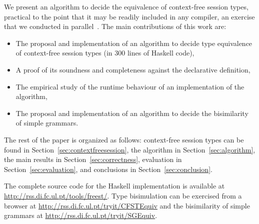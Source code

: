 

We present an algorithm to decide the equivalence of context-free
session types, practical to the point that it may be readily included
in any compiler, an exercise that we conducted in
parallel~\cite{almeida.etal_freest-functional-language}.
%
The main contributions of this work are:
%
\begin{itemize}
\item The proposal and implementation of an algorithm to decide type
  equivalence of context-free session types (in 300 lines of Haskell code),
\item A proof of its soundness and completeness against the
  declarative definition,
\item The empirical study of the runtime behaviour of an
  implementation of the algorithm,
\item The proposal and implementation of an algorithm to decide
  the bisimilarity of simple grammars.
\end{itemize}


The rest of the paper is organized as follows: context-free session
types can be found in Section~\ref{sec:contextfreesession}, the
algorithm in Section~\ref{sec:algorithm}, the main results in
Section~\ref{sec:correctness},
evaluation in Section~\ref{sec:evaluation}, and conclusions in
Section~\ref{sec:conclusion}.

The complete source code for the Haskell implementation is available
at \url{http://rss.di.fc.ul.pt/tools/freest/}.
%
Type bisimulation can be exercised from a browser at
\url{http://rss.di.fc.ul.pt/tryit/CFSTEquiv} and the bisimilarity of
simple grammars at \url{http://rss.di.fc.ul.pt/tryit/SGEquiv}.

